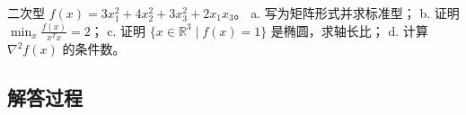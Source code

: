 \begin{example}[二次型分析]
    二次型 \( f(x) = 3x_1^2 + 4x_2^2 + 3x_3^2 + 2x_1x_3 \)。  
    a. 写为矩阵形式并求标准型；  
    b. 证明 \( \min_x \frac{f(x)}{x^T x} = 2 \)；  
    c. 证明 \( \{x \in \mathbb{R}^3 \mid f(x) = 1\} \) 是椭圆，求轴长比；  
    d. 计算 \( \nabla^2 f(x) \) 的条件数。
    \end{example}
    
    \subsection*{解答过程}
    